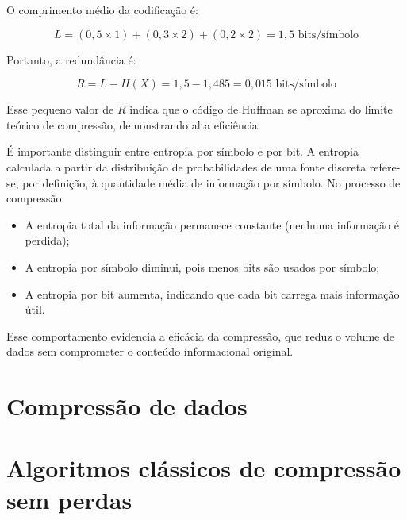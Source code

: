 O comprimento médio da codificação é:

\[
L = (0{,}5 \times 1) + (0{,}3 \times 2) + (0{,}2 \times 2) = 1{,}5 \text{ bits/símbolo}
\]

Portanto, a redundância é:

\[
R = L - H(X) = 1{,}5 - 1{,}485 = 0{,}015 \text{ bits/símbolo}
\]

Esse pequeno valor de \( R \) indica que o código de Huffman se aproxima do limite teórico de compressão, demonstrando alta eficiência.

É importante distinguir entre entropia por símbolo e por bit. A entropia calculada a partir da distribuição de probabilidades de uma fonte discreta refere-se, por definição, à quantidade média de informação por símbolo. No processo de compressão:

\begin{itemize}
    \item A entropia total da informação permanece constante (nenhuma informação é perdida);
    \item A entropia por símbolo diminui, pois menos bits são usados por símbolo;
    \item A entropia por bit aumenta, indicando que cada bit carrega mais informação útil.
\end{itemize}

Esse comportamento evidencia a eficácia da compressão, que reduz o volume de dados sem comprometer o conteúdo informacional original.

\section{Compressão de dados}

\section{Algoritmos clássicos de compressão sem perdas}

